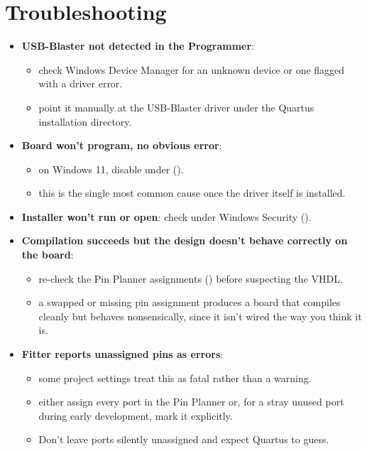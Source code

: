 \section{Troubleshooting}
\label{q:8}
\begin{itemize}
  \item \textbf{USB-Blaster not detected in the Programmer}:
  \begin{itemize}
    \item check Windows Device Manager for an unknown device or one flagged with a driver error.
    \item point it manually at the USB-Blaster driver under the Quartus installation directory.
  \end{itemize}
  \item \textbf{Board won't program, no obvious error}:
  \begin{itemize}
    \item on Windows 11, disable  under 
      ().
    \item this is the single most common cause once the driver itself is installed.
  \end{itemize}
  \item \textbf{Installer won't run or open}: check  under Windows Security
    ().
  \item \textbf{Compilation succeeds but the design doesn't behave correctly on the board}:
  \begin{itemize}
    \item re-check the Pin Planner assignments () before suspecting the VHDL.
    \item a swapped or missing pin assignment produces a board that compiles cleanly but behaves
      nonsensically, since it isn't wired the way you think it is.
  \end{itemize}
  \item \textbf{Fitter reports unassigned pins as errors}:
  \begin{itemize}
    \item some project settings treat this as fatal rather than a warning.
    \item either assign every port in the Pin Planner or, for a stray unused port during early
      development, mark it explicitly.
    \item Don't leave ports silently unassigned and expect Quartus to guess.
  \end{itemize}
\end{itemize}
